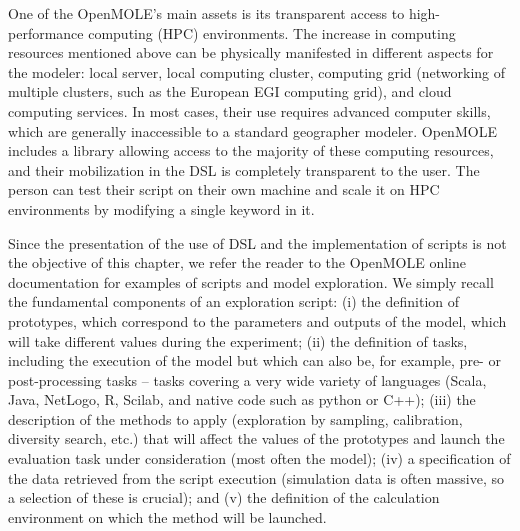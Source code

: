 \documentclass[10pt]{article}
\begin{document}
One of the OpenMOLE’s main assets is its transparent access to high- performance computing (HPC) environments. The increase in computing resources mentioned above can be physically manifested in different aspects for the modeler: local server, local computing cluster, computing grid (networking of multiple clusters, such as the European EGI computing grid), and cloud computing services. In most cases, their use requires advanced computer skills, which are generally inaccessible to a standard geographer modeler. OpenMOLE includes a library allowing access to the majority of these computing resources, and their mobilization in the DSL is completely transparent to the user. The person can test their script on their own machine and scale it on HPC environments by modifying a single keyword in it.

Since the presentation of the use of DSL and the implementation of scripts is not the objective of this chapter, we refer the reader to the OpenMOLE online documentation for examples of scripts and model exploration. We simply recall the fundamental components of an exploration script: (i) the definition of prototypes, which correspond to the parameters and outputs of the model, which will take different values during the experiment; (ii) the definition of tasks, including the execution of the model but which can also be, for example, pre- or post-processing tasks – tasks covering a very wide variety of languages (Scala, Java, NetLogo, R, Scilab, and native code such as python or C++); (iii) the description of the methods to apply (exploration by sampling, calibration, diversity search, etc.) that will affect the values of the prototypes and launch the evaluation task under consideration (most often the model); (iv) a specification of the data retrieved from the script execution (simulation data is often massive, so a selection of these is crucial); and (v) the definition of the calculation environment on which the method will be launched.
\end{document}
